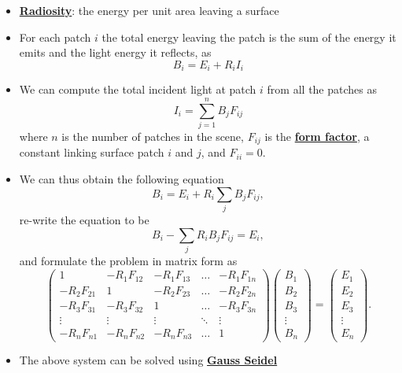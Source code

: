 \documentclass[twocolumn,landscape,10pt]{article}
\theoremstyle{definition}
\begin{document}
\begin{itemize}
    \item \underline{\textbf{Radiosity}}: the energy per unit area leaving a surface
    \item For each patch $i$ the total energy leaving the patch is the sum of
        the energy it emits and the light energy it reflects, as
        \[
            B_i=E_i+R_iI_i
        \]
    \item We can compute the total incident light at patch $i$ from all the
        patches as
        \[
            I_i=\sum_{j=1}^{n} B_jF_{ij}
        \]
        where $n$ is the number of patches in the scene, 
        $F_{ij}$ is the \underline{\textbf{form factor}},
        a constant linking surface patch $i$ and $j$, and $F_{ii}=0$.
    \item We can thus obtain the following equation
        \[
            B_i=E_i+R_i\sum_jB_jF_{ij},
        \]
        re-write the equation to be
        \[
            B_i-\sum_jR_iB_jF_{ij}=E_i,
        \]
        and formulate the problem in matrix form as
        \[
            \begin{pmatrix}
                1 & -R_1F_{12} & -R_1F_{13} & \ldots & -R_1F_{1n} \\
                -R_2F_{21} & 1 & -R_2F_{23} & \ldots & -R_2F_{2n} \\
                -R_3F_{31} & -R_3F_{32} & 1 & \ldots & -R_3F_{3n} \\
                \vdots & \vdots & \vdots & \ddots & \vdots \\
                -R_nF_{n1} & -R_nF_{n2} & -R_nF_{n3} & \ldots & 1
            \end{pmatrix} 
            \begin{pmatrix}
                B_1 \\
                B_2 \\
                B_3 \\
                \vdots \\
                B_n
            \end{pmatrix} 
            =
            \begin{pmatrix}
                E_1 \\
                E_2 \\
                E_3 \\
                \vdots \\
                E_n
            \end{pmatrix}.
        \]
    \item The above system can be solved using \underline{\textbf{Gauss Seidel}}

\end{itemize}
\end{document}
